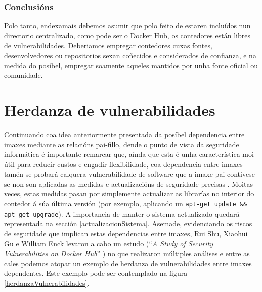 \subsubsection{Conclusións}

Polo tanto, endexamais debemos asumir que polo feito de estaren incluídos nun directorio centralizado, como pode ser o Docker Hub, os contedores están libres de vulnerabilidades. Deberiamos empregar contedores cuxas fontes, desenvolvedores ou repositorios sexan coñecidos e considerados de confianza, e na medida do posíbel, empregar soamente aqueles mantidos por unha fonte oficial ou comunidade.

\section{Herdanza de vulnerabilidades}

Continuando coa idea anteriormente presentada da posíbel dependencia entre imaxes mediante as relacións pai-fillo, dende o punto de vista da seguridade informática é importante remarcar que, aínda que esta é unha característica moi útil para reducir custos e engadir flexibilidade, coa dependencia entre imaxes tamén se probará calquera vulnerabilidade de software que a imaxe pai contivese se non son aplicadas as medidas e actualizacións de seguridade precisas \cite{studySecurityDockerHub}. Moitas veces, estas medidas pasan por simplemente actualizar as librarías no interior do contedor á súa última versión (por exemplo, aplicando un {\tt apt-get update \&\& apt-get upgrade}). A importancia de manter o sistema actualizado quedará representada na sección \ref{actualizacionSistema}. Asemade, evidenciando os riscos de seguridade que implican estas dependencias entre imaxes, Rui Shu, Xiaohui Gu e William Enck levaron a cabo un estudo (``\textit{A Study of Security Vulnerabilities on Docker Hub}'' \cite{studySecurityDockerHub}) no que realizaron múltiples análises e entre as cales podemos atopar un exemplo de herdanza de vulnerabilidades entre imaxes dependentes. Este exemplo pode ser contemplado na figura \ref{herdanzaVulnerabilidades}.

